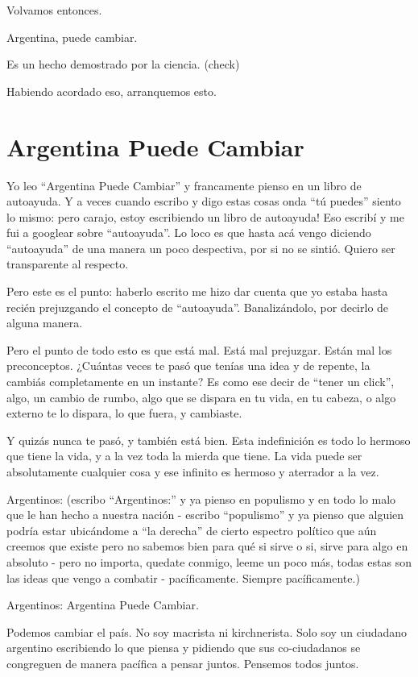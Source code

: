 \documentclass[
]{book}
\begin{document}
Volvamos entonces.

Argentina, puede cambiar.

Es un hecho demostrado por la ciencia. (check)

Habiendo acordado eso, arranquemos esto.

\hypertarget{argentina-puede-cambiar}{%
\section{Argentina Puede Cambiar}\label{argentina-puede-cambiar}}

Yo leo ``Argentina Puede Cambiar'' y francamente pienso en un libro de autoayuda. Y a veces cuando escribo y digo estas cosas onda ``tú puedes'' siento lo mismo: pero carajo, estoy escribiendo un libro de autoayuda! Eso escribí y me fui a googlear sobre ``autoayuda''. Lo loco es que hasta acá vengo diciendo ``autoayuda'' de una manera un poco despectiva, por si no se sintió. Quiero ser transparente al respecto.

Pero este es el punto: haberlo escrito me hizo dar cuenta que yo estaba hasta recién prejuzgando el concepto de ``autoayuda''. Banalizándolo, por decirlo de alguna manera.

Pero el punto de todo esto es que está mal. Está mal prejuzgar. Están mal los preconceptos. ¿Cuántas veces te pasó que tenías una idea y de repente, la cambiás completamente en un instante? Es como ese decir de ``tener un click'', algo, un cambio de rumbo, algo que se dispara en tu vida, en tu cabeza, o algo externo te lo dispara, lo que fuera, y cambiaste.

Y quizás nunca te pasó, y también está bien. Esta indefinición es todo lo hermoso que tiene la vida, y a la vez toda la mierda que tiene. La vida puede ser absolutamente cualquier cosa y ese infinito es hermoso y aterrador a la vez.

Argentinos: (escribo ``Argentinos:'' y ya pienso en populismo y en todo lo malo que le han hecho a nuestra nación - escribo ``populismo'' y ya pienso que alguien podría estar ubicándome a ``la derecha'' de cierto espectro político que aún creemos que existe pero no sabemos bien para qué si sirve o si, sirve para algo en absoluto - pero no importa, quedate conmigo, leeme un poco más, todas estas son las ideas que vengo a combatir - pacíficamente. Siempre pacíficamente.)

Argentinos: Argentina Puede Cambiar.

Podemos cambiar el país. No soy macrista ni kirchnerista. Solo soy un ciudadano argentino escribiendo lo que piensa y pidiendo que sus co-ciudadanos se congreguen de manera pacífica a pensar juntos. Pensemos todos juntos.
\end{document}
